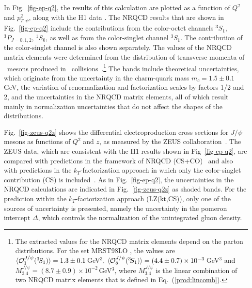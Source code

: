 In Fig.~\ref{fig-ep-q2}, the results of this calculation are plotted as
a function of $Q^2$ and $p^2_{T,\psi}$, along with the H1 data
\cite{Adloff:2002ey}. The NRQCD results that are shown in
Fig.~\ref{fig-ep-q2} include the contributions from the color-octet
channels $^{3}\!S_1$, $^{3}\!P_{J=0,1,2}$, $^{1}\!S_0$, as well as from
the color-singlet channel $^{3}\!S_1$. The contribution of the
color-singlet channel is also shown separately. The values of the NRQCD
matrix elements were determined from the distribution of transverse
momenta of \jpsi\ mesons produced in \ppbar\
collisions~\cite{Braaten:1999qk}.\footnote{\label{fn} The extracted
values for the NRQCD matrix elements depend on the parton distributions.
For the set MRST98LO \cite{Martin:1998sq}, the values are $\langle {\cal
O}_1^{J/\psi}(^3\!S_1)\rangle=1.3\pm 0.1 \,$GeV$^3$, $\langle {\cal
O}_8^{J/\psi}(^3\!S_1)\rangle=(4.4\pm0.7) \times 10^{-3}
\,$GeV$^3$ and $M_{3.4}^{J/\psi}=(8.7\pm 0.9) \times 10^{-2}\,$GeV$^3$,
where $M_{3.4}^{J/\psi}$ is the linear combination of two NRQCD matrix
elements that is defined in Eq.~(\ref{prod:lincomb}).}
%
The bands include theoretical uncertainties, which originate from the
uncertainty in the charm-quark mass $m_c=1.5\pm0.1$ GeV, the variation
of renormalization and factorization scales by factors 1/2 and 2, and
the uncertainties in the NRQCD matrix elements, all of which result
mainly in normalization uncertainties that do not affect the shapes of
the distributions.

Fig.~\ref{fig-zeus-q2z} shows the differential electroproduction
cross sections for $J/\psi$ mesons as functions of $Q^2$ and $z$,
as measured by the ZEUS collaboration~\cite{zeus-eps03-565}. 
The ZEUS data, which are consistent with the H1 results 
shown in Fig~\ref{fig-ep-q2}, are compared with 
predictions in the framework of 
NRQCD (CS+CO)~\cite{Kniehl:2001tk} and also with predictions 
in the $k_T$-factorization approach in which only 
the color-singlet contribution (CS) is included~\cite{Lipatov:2002tc}.
As in Fig.~\ref{fig-ep-q2}, the uncertainties in the 
NRQCD calculations are indicated in 
Fig.~\ref{fig-zeus-q2z} as shaded bands. 
For the prediction within the $k_T$-factorization approach 
(LZ(kt,CS)),
only one of the sources of uncertainty is presented, namely the 
uncertainty in the pomeron intercept $\Delta$, 
which controls the normalization
of the unintegrated gluon density.

